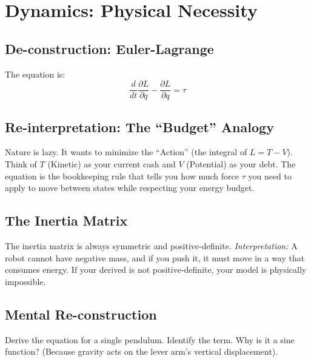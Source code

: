 \chapter{Dynamics: Physical Necessity}


\section{De-construction: Euler-Lagrange}
The  equation is:
\begin{equation}
    \frac{d}{dt}\frac{\partial L}{\partial \dot{q}} - \frac{\partial L}{\partial q} = \tau
\end{equation}

\section{Re-interpretation: The ``Budget'' Analogy}
\begin{intuitionbox}
    Nature is lazy. It wants to minimize the ``Action'' (the integral of \(L = T-V\)).
    Think of \(T\) (Kinetic) as your current cash and \(V\) (Potential) as your debt. The  equation is the bookkeeping rule that tells you how much force \(\tau\) you need to apply to move between states while respecting your energy budget.
\end{intuitionbox}

\section{The Inertia Matrix }
\begin{designrule}
    The inertia matrix  is always symmetric and positive-definite.
    \textit{Interpretation:} A robot cannot have negative mass, and if you push it, it must move in a way that consumes energy. If your derived  is not positive-definite, your model is physically impossible.
\end{designrule}

\section{Mental Re-construction}
\begin{practice}
    Derive the  equation for a single pendulum. Identify the  term. Why is it a sine function? (Because gravity acts on the lever arm's vertical displacement).
\end{practice}
